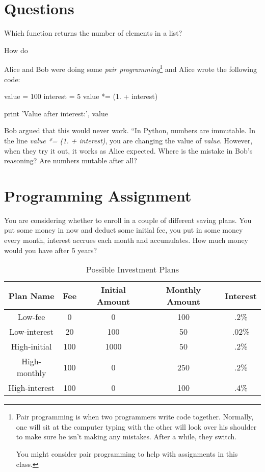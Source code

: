 

\chapter{Questions}

\question
Which function returns the number of elements in a list?

\question
How do

\question
Alice and Bob were doing some \textit{pair programming}\footnote{Pair programming is when two programmers write code together. Normally, one will sit at the computer typing with the other will look over his shoulder to make sure he isn't making any mistakes. After a while, they switch.

You might consider pair programming to help with assignments in this class.} and Alice wrote the following code:

\begin{python}
value = 100
interest = 5
value *= (1. + interest)

print 'Value after interest:', value
\end{python}

Bob argued that this would never work. ``In Python, numbers are immutable. In the line \textit{value *= (1. + interest)}, you are changing the value of \textit{value}. However, when they try it out, it works as Alice expected. Where is the mistake in Bob's reasoning? Are numbers mutable after all?

\chapter{Programming Assignment}

You are considering whether to enroll in a couple of different saving plans. You put some money in now and deduct some initial fee, you put in some money every month, interest accrues each month and accumulates. How much money would you have after 5 years?

\begin{table}
\centering
\begin{tabular}{ccccc}
\toprule
Plan Name & Fee & Initial Amount & Monthly Amount & Interest \\
\midrule
Low-fee & 0 & 0 & 100 & .2\% \\
Low-interest & 20 & 100 & 50 & .02\% \\
High-initial & 100 & 1000 & 50 & .2\% \\
High-monthly & 100 & 0 & 250 & .2\% \\
High-interest & 100 & 0 & 100 & .4\% \\
\end{tabular}
\caption{Possible Investment Plans}
\label{tab:plans}
\end{table}




